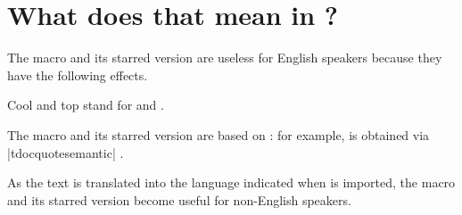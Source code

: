 \documentclass[10pt, a4paper]{article}
\begin{document}
\section{What does that mean in ?}

The macro  and its starred version are useless for English speakers because they have the following effects.


\begin{tdoclatex}
Cool and top stand for  and .
\end{tdoclatex}


The macro  and its starred version are based on  : for example,  is obtained via \tdocinlatex|tdocquote{semantic}| .


\begin{tdocnote}
    As the text  is translated into the language indicated when  is imported, the macro  and its starred version become useful for non-English speakers.
\end{tdocnote}
\end{document}
